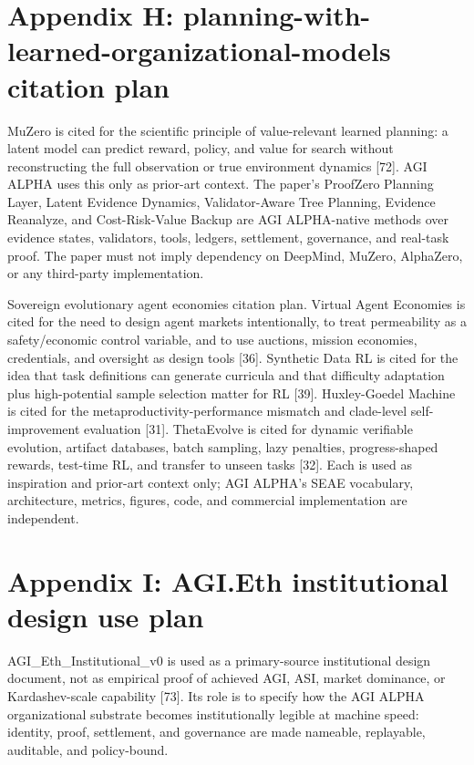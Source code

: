 \section{Appendix H: planning-with-learned-organizational-models
citation
plan}\label{appendix-h-planning-with-learned-organizational-models-citation-plan}

MuZero is cited for the scientific principle of value-relevant learned
planning: a latent model can predict reward, policy, and value for
search without reconstructing the full observation or true environment
dynamics {[}72{]}. AGI ALPHA uses this only as prior-art context. The
paper's ProofZero Planning Layer, Latent Evidence Dynamics,
Validator-Aware Tree Planning, Evidence Reanalyze, and Cost-Risk-Value
Backup are AGI ALPHA-native methods over evidence states, validators,
tools, ledgers, settlement, governance, and real-task proof. The paper
must not imply dependency on DeepMind, MuZero, AlphaZero, or any
third-party implementation.

Sovereign evolutionary agent economies citation plan. Virtual Agent
Economies is cited for the need to design agent markets intentionally,
to treat permeability as a safety/economic control variable, and to use
auctions, mission economies, credentials, and oversight as design tools
{[}36{]}. Synthetic Data RL is cited for the idea that task definitions
can generate curricula and that difficulty adaptation plus
high-potential sample selection matter for RL {[}39{]}. Huxley-Goedel
Machine is cited for the metaproductivity-performance mismatch and
clade-level self-improvement evaluation {[}31{]}. ThetaEvolve is cited
for dynamic verifiable evolution, artifact databases, batch sampling,
lazy penalties, progress-shaped rewards, test-time RL, and transfer to
unseen tasks {[}32{]}. Each is used as inspiration and prior-art context
only; AGI ALPHA's SEAE vocabulary, architecture, metrics, figures, code,
and commercial implementation are independent.

\section{Appendix I: AGI.Eth institutional design use
plan}\label{appendix-i-agi.eth-institutional-design-use-plan}

AGI\_Eth\_Institutional\_v0 is used as a primary-source institutional
design document, not as empirical proof of achieved AGI, ASI, market
dominance, or Kardashev-scale capability {[}73{]}. Its role is to
specify how the AGI ALPHA organizational substrate becomes
institutionally legible at machine speed: identity, proof, settlement,
and governance are made nameable, replayable, auditable, and
policy-bound.


